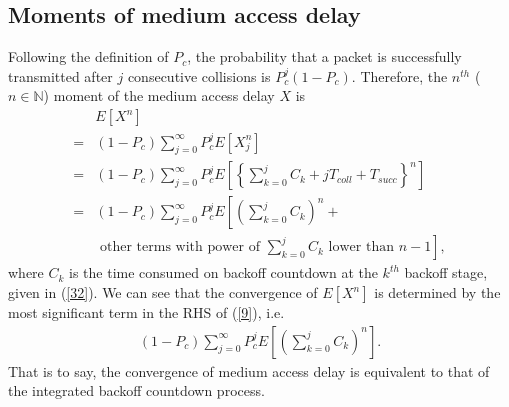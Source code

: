 \documentclass[journal]{IEEEtran}
\begin{document}
\subsection{Moments of medium access delay}
Following the definition of $P_c$, the probability that a packet is successfully transmitted after $j$ consecutive collisions is $P_c^j(1-P_c)$. Therefore, the $n^{th}$ ($n\in \mathbb{N}$) moment of the medium access delay $X$ is
\begin{equation}
\label{9}
\begin{aligned}
&E\left[X^n\right]\\
=&(1-P_c) \sum_{j=0}^{\infty}P_c^jE\left[X_j^n\right] \\
=&(1-P_c) \sum_{j=0}^{\infty}P_c^jE\left[\left\{\sum_{k=0}^{j}C_k + jT_{coll} + T_{succ}\right\}^n\right]\\
=&(1-P_c)\sum_{j=0}^{\infty}P_c^jE\left[\left(\sum_{k=0}^{j}C_k\right)^n + \right.\\
 &\left.\text{ other terms with power of } \sum_{k=0}^{j}C_k \text{ lower than } n-1\right],
\end{aligned}
\end{equation}
where $C_k$ is the time consumed on backoff countdown at the $k^{th}$ backoff stage, given in (\ref{32}). We can see that the convergence of $E\left[X^n\right]$ is determined by the most significant term in the RHS of (\ref{9}), i.e.
\begin{equation}
\label{10}
\begin{aligned}
(1-P_c)\sum_{j=0}^{\infty}P_c^jE\left[\left(\sum_{k=0}^{j}C_k\right)^n\right].
\end{aligned}
\end{equation}
That is to say, the convergence of medium access delay is equivalent to that of the integrated backoff countdown process.
\end{document}
